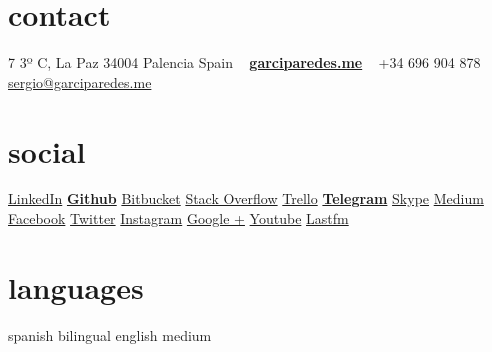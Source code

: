 \documentclass[]{friggeri-cv} %
\begin{document}


    \begin{aside} %

        \section{contact}
            7 3º C, La Paz
            34004 Palencia
            Spain
            ~
            \href{http://garciparedes.me}{\textbf{garciparedes.me}}
            ~
            +34 696 904 878
            \href{mailto:sergio@garciparedes.me}{sergio@garciparedes.me}
        \section{social}
            \href{https://es.linkedin.com/in/garciparedes/en}{LinkedIn\quad\faLinkedin }
            \href{https://github.com/garciparedes}{\textbf{Github}\quad\faGithub }
            \href{https://bitbucket.org/garciparedes/}{Bitbucket\quad\faBitbucket }
            \href{http://stackoverflow.com/users/3921457/garciparedes}{Stack Overflow\quad\faStackOverflow }
            \href{https://trello.com/garciparedes}{Trello\quad\faTrello }
            \href{https://telegram.me/garciparedes}{\textbf{Telegram}\quad\faPaperPlane }
            \href{skype:garciparedes?call}{Skype\quad\faSkype }
            \href{https://medium.com/@garciparedes}{Medium\quad\faMedium }
            \href{https://facebook.com/garciparedes}{Facebook\quad\faFacebook}
            \href{https://twitter.com/garciparedes}{Twitter\quad\faTwitter }
            \href{https://www.instagram.com/garciparedes/}{Instagram\quad\faInstagram }
            \href{https://plus.google.com/+SergioGarcia-garciparedes/}{Google +\quad\faGooglePlus }
            \href{https://www.youtube.com/user/GaRcYpArEdEs/}{Youtube\quad\faYoutubePlay }
            \href{http://www.last.fm/user/garciparedes/}{Lastfm\quad\faLastfm}
        \section{languages}
            spanish bilingual
            english medium

\end{aside}
\end{document}
